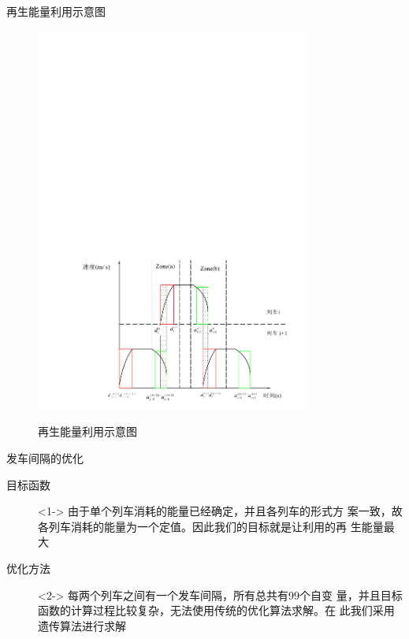 \documentclass{beamer}
\begin{document}
\begin{frame}{再生能量利用示意图}
\begin{figure}
  \centering
  \includegraphics[trim=3cm 0.4cm 1cm 17.2cm, width=9cm]{fig/fig12/fig12.pdf}\\
  \caption{再生能量利用示意图}
\end{figure}

\end{frame}

\begin{frame}{发车间隔的优化}

\begin{description}
    \item[目标函数]<1-> 由于单个列车消耗的能量已经确定，并且各列车的形式方
        案一致，故各列车消耗的能量为一个定值。因此我们的目标就是让利用的再
        生能量最大
    \item[优化方法]<2-> 每两个列车之间有一个发车间隔，所有总共有99个自变
        量，并且目标函数的计算过程比较复杂，无法使用传统的优化算法求解。在
        此我们采用遗传算法进行求解
\end{description}

\end{frame}
\end{document}
